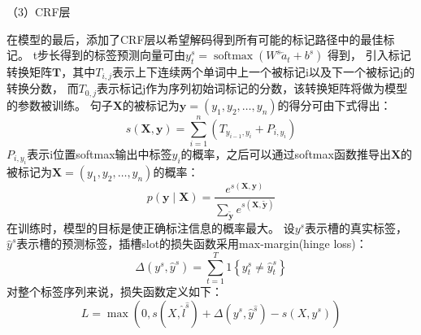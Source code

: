 （3）CRF层

在模型的最后，添加了CRF层以希望解码得到所有可能的标记路径中的最佳标记。 
t步长得到的标签预测向量可由$y_{t}^{s}=\operatorname{softmax}\left(W^{s} \overleftarrow{a}_{t}+b^{s}\right)$
得到，
引入标记转换矩阵$\mathbf{T}$，其中$T_{i,j}$表示上下连续两个单词中上一个被标记i以及下一个被标记j的转换分数，
而$T_{0,j}$表示标记j作为序列初始词标记的分数，该转换矩阵将做为模型的参数被训练。 
句子$\mathbf{X}$的被标记为$\mathbf{y}=(y_1,y_2,\dots,y_n)$的得分可由下式得出：
\begin{equation}
  s(\mathbf{X}, \mathbf{y})=\sum_{i=1}^{n}\left(T_{y_{i-1}, y_{i}}+P_{i, y_{i}}\right)
\end{equation}
$P_{i, y_{i}}$表示i位置softmax输出中标签$y_{i}$的概率，之后可以通过softmax函数推导出$\mathbf{X}$的被标记为$\mathbf{X}=(y_1,y_2,\dots,y_n)$的概率：
\begin{equation}
  p(\mathbf{y} \mid \mathbf{X})=\frac{e^{s(\mathbf{X}, \mathbf{y})}}{\sum_{\tilde{\mathbf{y}}} e^{s(\mathbf{X}, \tilde{\mathbf{y}})}}
\end{equation}
在训练时，模型的目标是使正确标注信息的概率最大。
设$y^{s}$表示槽的真实标签，$\hat y^{s}$表示槽的预测标签，插槽slot的损失函数采用max-margin(hinge loss)：
\begin{equation}
\Delta\left(y^{s}, \hat{y}^{s}\right)=\sum_{t=1}^{T} 1\left\{y_{t}^{s} \neq \hat{y}_{t}^{s}\right\}
\end{equation}
对整个标签序列来说，损失函数定义如下：
\begin{equation}
L=\max (0, s(X,\hat{l}^{\hat{s}})+\Delta(y^{s}, \hat{y}^{\hat{s}})-s(X,y^{s}))
\end{equation}








